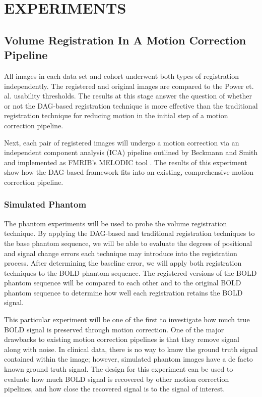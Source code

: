\chapter{EXPERIMENTS}
\label{ch:experiments}

\section{Volume Registration In A Motion Correction Pipeline}

All images in each data set and cohort underwent both types of registration independently. The registered and original images are compared to the Power et. al. usability thresholds. The results at this stage answer the question of whether or not the DAG-based registration technique is more effective than the traditional registration technique for reducing motion in the initial step of a motion correction pipeline.  

Next, each pair of registered images will undergo a motion correction via an independent component analysis (ICA) pipeline outlined by Beckmann and Smith and implemented as FMRIB's MELODIC tool \cite{Beckmann2004}. The results of this experiment show how the DAG-based framework fits into an existing, comprehensive motion correction pipeline. 

\subsection{Simulated Phantom}

The phantom experiments will be used to probe the volume registration technique. By applying the DAG-based and traditional registration techniques to the base phantom sequence, we will be able to evaluate the degrees of positional and signal change errors each technique may introduce into the registration process. After determining the baseline error, we will apply both registration techniques to the BOLD phantom sequence. The registered versions of the BOLD phantom sequence will be compared to each other and to the original BOLD phantom sequence to determine how well each registration retains the BOLD signal.

This particular experiment will be one of the first to investigate how much true BOLD signal is preserved through motion correction. One of the major drawbacks to existing motion correction pipelines is that they remove signal along with noise. In clinical data, there is no way to know the ground truth signal contained within the image; however, simulated phantom images have a de facto known ground truth signal. The design for this experiment can be used to evaluate how much BOLD signal is recovered by other motion correction pipelines, and how close the recovered signal is to the signal of interest.

